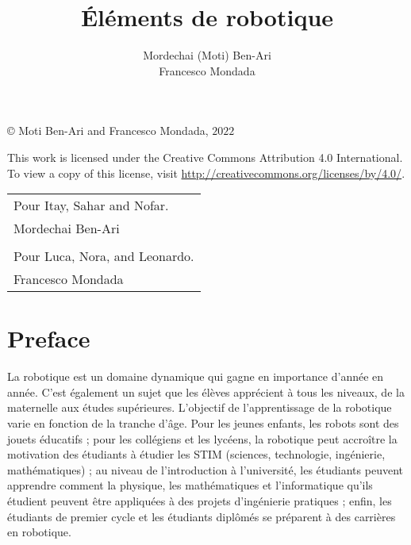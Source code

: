 
\author{Mordechai (Moti) Ben-Ari\\Francesco Mondada}
\title{Éléments de robotique}
\date{}
\maketitle

\vfill

\begin{center}
\copyright{} Moti Ben-Ari and Francesco Mondada, $2022$
 \end{center}
 
\begin{small}
This work is licensed under the Creative Commons Attribution 4.0 International. To view a copy of this license, visit \url{http://creativecommons.org/licenses/by/4.0/}.
\end{small}


\newpage
\mbox{}
\vfill
\begin{center}
\begin{tabular}{l}
Pour Itay, Sahar and Nofar.\\
Mordechai Ben-Ari\\
\\
Pour Luca, Nora, and Leonardo.\\
Francesco Mondada
\end{tabular}
\end{center}
\vfill
\mbox{}
\newpage

\chapter*{Preface}

La robotique est un domaine dynamique qui gagne en importance d'année en année. C'est également un sujet que les élèves apprécient à tous les niveaux, de la maternelle aux études supérieures. L'objectif de l'apprentissage de la robotique varie en fonction de la tranche d'âge. Pour les jeunes enfants, les robots sont des jouets éducatifs ; pour les collégiens et les lycéens, la robotique peut accroître la motivation des étudiants à étudier les STIM (sciences, technologie, ingénierie, mathématiques) ; au niveau de l'introduction à l'université, les étudiants peuvent apprendre comment la physique, les mathématiques et l'informatique qu'ils étudient peuvent être appliquées à des projets d'ingénierie pratiques ; enfin, les étudiants de premier cycle et les étudiants diplômés se préparent à des carrières en robotique.

